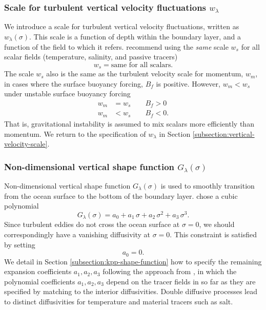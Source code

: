 \subsubsection{Scale for turbulent vertical velocity fluctuations $w_{\lambda}$}
\label{subsubsection:turbulent-vertical-velocity-scale}

We introduce a scale for turbulent vertical velocity fluctuations,
written as $w_{\lambda}(\sigma)$.  This scale is a function of depth
within the boundary layer, and a function of the field to which it
refers.  \cite{LargeKPP} recommend using the {\it same} scale $w_{s}$
for all scalar fields (temperature, salinity, and passive tracers)
\begin{equation}
  w_{s}= \mbox{same for all scalars}.
\end{equation}
The scale $w_{s}$ also is the same as the turbulent velocity scale for
momentum, $w_{m}$, in cases where the surface buoyancy forcing,
$B_{f}$ is positive.  However, $w_{m} < w_{s}$ under unstable surface
buoyancy forcing
\begin{subequations}
\begin{align}
  w_{m}  &= w_{s}  \qquad B_{f} > 0 \\
   w_{m} &< w_{s} \qquad B_{f} < 0.
\end{align}
\end{subequations}
That is, gravitational instability is assumed to mix scalars more
efficiently than momentum.  We return to the specification of
$w_{\lambda}$ in Section \ref{subsection:vertical-velocity-scale}.


\subsubsection{Non-dimensional vertical shape function $G_{\lambda}(\sigma)$}

Non-dimensional vertical shape function $G_{\lambda}(\sigma)$ is used to
smoothly transition from the ocean surface to the bottom of the
boundary layer. \cite{LargeKPP} chose a cubic polynomial
\begin{equation}
 G_{\lambda}(\sigma) = a_{0} + a_{1} \, \sigma + a_{2} \, \sigma^{2} + a_{3} \, \sigma^{3}.
\label{eq:shape-function-gsigma}
\end{equation}
Since turbulent eddies do not cross the ocean surface at $\sigma=0$,
we should correspondingly have a vanishing diffusivity at $\sigma=0$.
This constraint is satisfied by setting 
\begin{equation}
 a_{0} = 0.
\end{equation}
We detail in Section \ref{subsection:kpp-shape-function} how to
specify the remaining expansion coefficients $a_{1}, a_{2}, a_{3}$
following the approach from \cite{LargeKPP}, in which the polynomial
coefficients $a_{1}, a_{2}, a_{3}$ depend on the tracer fields in so
far as they are specified by matching to the interior diffusivities.
Double diffusive processes lead to distinct diffusivities for
temperature and material tracers such as salt.  

